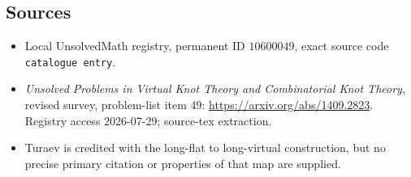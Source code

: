 \documentclass[11pt]{article}
\begin{document}
\subsection{Sources}
\begin{itemize}
\item Local UnsolvedMath registry, permanent ID \(10600049\), exact source code \texttt{catalogue entry}.
\item \emph{Unsolved Problems in Virtual Knot Theory and Combinatorial Knot Theory}, revised survey, problem-list item 49: \url{https://arxiv.org/abs/1409.2823}. Registry access 2026-07-29; source-tex extraction.
\item Turaev is credited with the long-flat to long-virtual construction, but no precise primary citation or properties of that map are supplied.
\end{itemize}
\end{document}
